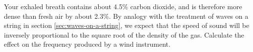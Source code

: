 Your exhaled breath contains about 4.5\% carbon dioxide,
and is therefore more dense than fresh air by about 2.3\%.
By analogy with the treatment of waves on a string in
section \ref{sec:waves-on-a-string}, we expect that the speed of sound will be
inversely proportional to the square root of the density of
the gas. Calculate the effect on the frequency produced
by a wind instrument.
